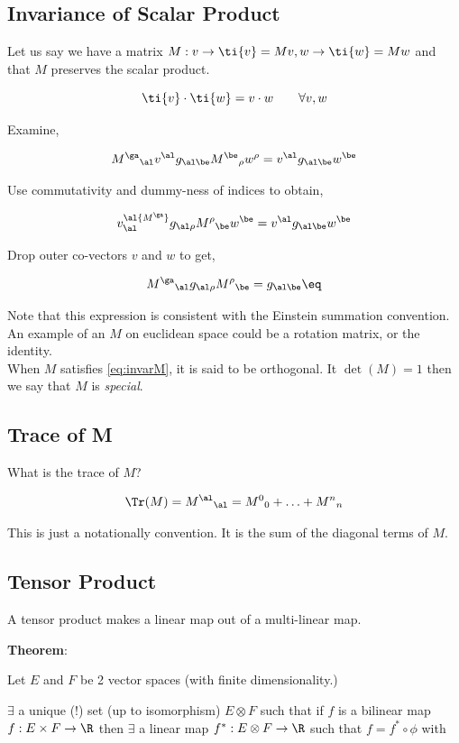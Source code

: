 \documentclass{article}
\newcommand{\heading}[1]{\vspace{0.1in}\textbf{#1}:}
\begin{document}
\subsection{Invariance of Scalar Product}

Let us say we have a matrix $M : v \to \ti{v} = Mv, w \to \ti{w} = Mw$ and that $M$ preserves the scalar product.

\[ \ti{v} \cdot \ti{w} = v \cdot w \qquad \forall v, w \]

Examine,

\[ {M^\ga}_\al v^\al g_{\al\be} {M^\be}_\rho w^\rho = v^\al g_{\al\be}w^\be \]

Use commutativity and dummy-ness of indices to obtain,

\[ v^\al {M^\ga}_\al g_{\al\rho} {M^\rho}_\be w^\be = v^\al g_{\al\be}w^\be \]

Drop outer co-vectors $v$ and $w$ to get,

\[ {M^\ga}_\al g_{\al\rho} {M^\rho}_\be = g_{\al\be} \eq \label{eq:invarM} \]

Note that this expression is consistent with the Einstein summation convention. \\

An example of an $M$ on euclidean space could be a rotation matrix, or the identity. \\

When $M$ satisfies \ref{eq:invarM}, it is said to be orthogonal. It $\det(M) = 1$ then we say that $M$ is \textit{special}.

\subsection{Trace of M}

What is the trace of $M$?

\[ \Tr(M) = {M^\al}_\al = {M^0}_0 + \ldots + {M^n}_n\]

This is just a notationally convention. It is the sum of the diagonal terms of $M$.

\subsection{Tensor Product}

A tensor product makes a linear map out of a multi-linear map.

\heading{Theorem}

Let $E$ and $F$ be 2 vector spaces (with finite dimensionality.)

$\exists $ a unique ($!$) set (up to isomorphism) $E \otimes F$ such that if $f$ is a bilinear map $f: E \times F \to \R$ then $\exists$ a linear map $f^* : E \otimes F \to \R$ such that $f = f^* \circ \phi$ with
\end{document}
